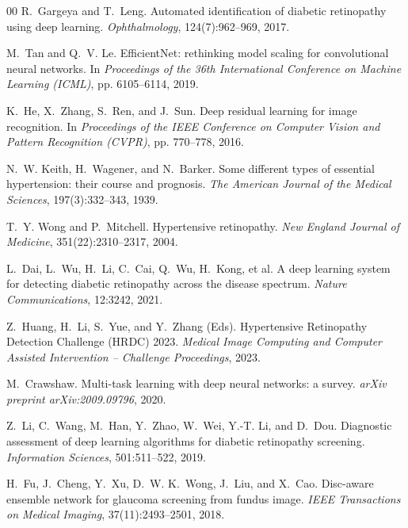 \documentclass[review,12pt]{elsarticle}
\begin{document}
\begin{thebibliography}{00}
R.~Gargeya and T.~Leng.
\newblock Automated identification of diabetic retinopathy using deep learning.
\newblock \textit{Ophthalmology}, 124(7):962--969, 2017.

M.~Tan and Q.~V. Le.
\newblock EfficientNet: rethinking model scaling for convolutional neural
networks.
\newblock In \textit{Proceedings of the 36th International Conference on
Machine Learning (ICML)}, pp. 6105--6114, 2019.

K.~He, X.~Zhang, S.~Ren, and J.~Sun.
\newblock Deep residual learning for image recognition.
\newblock In \textit{Proceedings of the IEEE Conference on Computer Vision and
Pattern Recognition (CVPR)}, pp. 770--778, 2016.

N.~W. Keith, H.~Wagener, and N.~Barker.
\newblock Some different types of essential hypertension: their course and
prognosis.
\newblock \textit{The American Journal of the Medical Sciences},
197(3):332--343, 1939.

T.~Y. Wong and P.~Mitchell.
\newblock Hypertensive retinopathy.
\newblock \textit{New England Journal of Medicine}, 351(22):2310--2317, 2004.

L.~Dai, L.~Wu, H.~Li, C.~Cai, Q.~Wu, H.~Kong, et al.
\newblock A deep learning system for detecting diabetic retinopathy across the
disease spectrum.
\newblock \textit{Nature Communications}, 12:3242, 2021.

Z.~Huang, H.~Li, S.~Yue, and Y.~Zhang (Eds).
\newblock Hypertensive Retinopathy Detection Challenge (HRDC) 2023.
\newblock \textit{Medical Image Computing and Computer Assisted
Intervention -- Challenge Proceedings}, 2023.

M.~Crawshaw.
\newblock Multi-task learning with deep neural networks: a survey.
\newblock \textit{arXiv preprint arXiv:2009.09796}, 2020.

Z.~Li, C.~Wang, M.~Han, Y.~Zhao, W.~Wei, Y.-T. Li, and D.~Dou.
\newblock Diagnostic assessment of deep learning algorithms for diabetic
retinopathy screening.
\newblock \textit{Information Sciences}, 501:511--522, 2019.

H.~Fu, J.~Cheng, Y.~Xu, D.~W. K.~Wong, J.~Liu, and X.~Cao.
\newblock Disc-aware ensemble network for glaucoma screening from fundus image.
\newblock \textit{IEEE Transactions on Medical Imaging}, 37(11):2493--2501,
2018.


\end{thebibliography}
\end{document}
